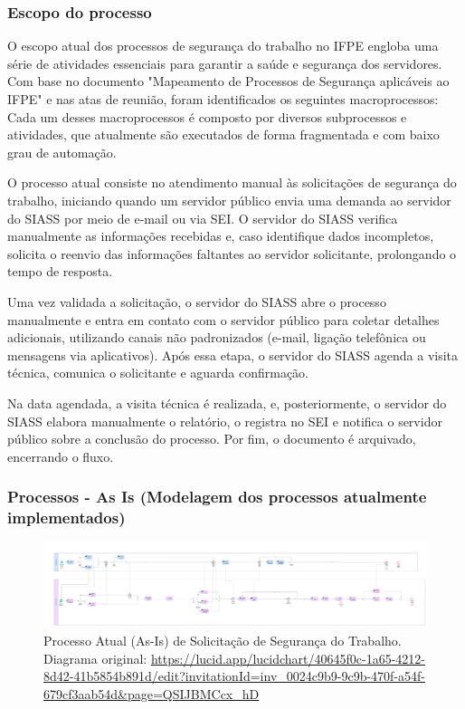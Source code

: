 \documentclass[12pt,a4paper]{article}
\begin{document}
\subsubsection{Escopo do processo}
O escopo atual dos processos de segurança do trabalho no IFPE engloba uma série de atividades essenciais para garantir a saúde e segurança dos servidores. Com base no documento "Mapeamento de Processos de Segurança aplicáveis ao IFPE" e nas atas de reunião, foram identificados os seguintes macroprocessos:
Cada um desses macroprocessos é composto por diversos subprocessos e atividades, que atualmente são executados de forma fragmentada e com baixo grau de automação.

O processo atual consiste no atendimento manual às solicitações de segurança do trabalho, iniciando quando um servidor público envia uma demanda ao servidor do SIASS por meio de e-mail ou via SEI. O servidor do SIASS verifica manualmente as informações recebidas e, caso identifique dados incompletos, solicita o reenvio das informações faltantes ao servidor solicitante, prolongando o tempo de resposta.

Uma vez validada a solicitação, o servidor do SIASS abre o processo manualmente e entra em contato com o servidor público para coletar detalhes adicionais, utilizando canais não padronizados (e-mail, ligação telefônica ou mensagens via aplicativos). Após essa etapa, o servidor do SIASS agenda a visita técnica, comunica o solicitante e aguarda confirmação.

Na data agendada, a visita técnica é realizada, e, posteriormente, o servidor do SIASS elabora manualmente o relatório, o registra no SEI e notifica o servidor público sobre a conclusão do processo. Por fim, o documento é arquivado, encerrando o fluxo.

\subsubsection{Processos - As Is (Modelagem dos processos atualmente implementados)}

\begin{landscape}
\begin{figure}[p]
\centering
\includegraphics[width=0.85\paperwidth, height=0.8\paperheight, keepaspectratio]{images/AS-IS.jpg}
\caption{Processo Atual (As-Is) de Solicitação de Segurança do Trabalho. \\ Diagrama original: \url{https://lucid.app/lucidchart/40645f0c-1a65-4212-8d42-41b5854b891d/edit?invitationId=inv_0024c9b9-9c9b-470f-a54f-679cf3aab54d&page=QSIJBMCcx_hD}}
\end{figure}
\end{landscape}
\end{document}
